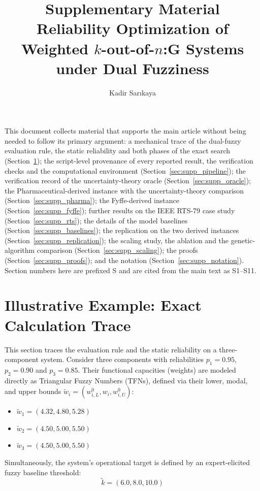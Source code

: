 \documentclass[11pt]{article}
\title{Supplementary Material\\[4pt]
\large Reliability Optimization of Weighted $k$-out-of-$n$:G Systems under Dual Fuzziness}
\author{\ifdefined\anonbuild\else Kadir Sar\i kaya\fi}
\date{}
\begin{document}
\maketitle
\sloppy

\noindent This document collects material that supports the main article without being needed to
follow its primary argument: a mechanical trace of the dual-fuzzy evaluation rule, the static
reliability and both phases of the exact search (Section~\ref{sec:supp_trace}); the script-level provenance of every
reported result, the verification checks and the computational environment (Section~\ref{sec:supp_pipeline}); the
verification record of the uncertainty-theory oracle (Section~\ref{sec:supp_oracle}); the Pharmaceutical-derived instance
with the uncertainty-theory comparison (Section~\ref{sec:supp_pharma}); the Fyffe-derived instance (Section~\ref{sec:supp_fyffe}); further
results on the IEEE RTS-79 case study (Section~\ref{sec:supp_rts}); the details of the model baselines
(Section~\ref{sec:supp_baselines}); the replication on the two derived instances (Section~\ref{sec:supp_replication});
the scaling study, the ablation and the genetic-algorithm comparison (Section~\ref{sec:supp_scaling}); the proofs
(Section~\ref{sec:supp_proofs}); and the notation (Section~\ref{sec:supp_notation}). Section numbers here are
prefixed S and are cited from the main text as S1--S11.

\section{Illustrative Example: Exact Calculation Trace} \label{sec:supp_trace}

This section traces the evaluation rule and the static reliability on a three-component system. Consider three components with reliabilities $p_1 = 0.95$, $p_2 = 0.90$ and $p_3 = 0.85$. Their functional capacities (weights) are modeled directly as Triangular Fuzzy Numbers (TFNs), defined via their lower, modal, and upper bounds $\tilde{w}_i = (w_{i,L}^0, w_i, w_{i,U}^0)$:
\begin{itemize}
    \item $\tilde{w}_1 = (4.32, 4.80, 5.28)$
    \item $\tilde{w}_2 = (4.50, 5.00, 5.50)$
    \item $\tilde{w}_3 = (4.50, 5.00, 5.50)$
\end{itemize}

Simultaneously, the system's operational target is defined by an expert-elicited fuzzy baseline threshold:
\begin{equation}
    \tilde{k} = (6.0, 8.0, 10.0)
\end{equation}
\end{document}
